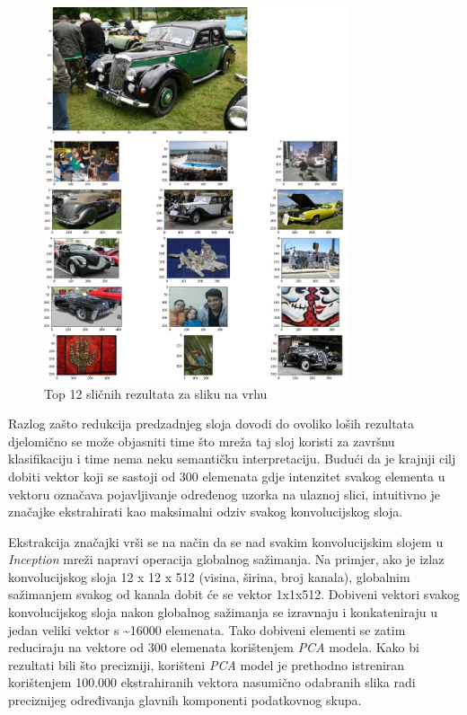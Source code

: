 \documentclass[times, utf8, proizvoljni, numeric]{fer}
\begin{document}
\begin{figure}[H]
	\begin{center}
		\captionsetup{justification=centering}
		\includegraphics[width=0.8\textwidth]{./imgs/inception_zadnji_sloj_auti_greska.png}
		\caption{Top 12 sličnih rezultata za sliku na vrhu}
		\label{fg:inception_zadnji_sloj_auti_greska}
	\end{center}
\end{figure}

Razlog zašto redukcija predzadnjeg sloja dovodi do ovoliko loših rezultata djelomično se može objasniti time što mreža taj sloj koristi za završnu klasifikaciju i time nema neku semantičku interpretaciju. Budući da je krajnji cilj dobiti vektor koji se sastoji od 300 elemenata gdje intenzitet svakog elementa u vektoru označava pojavljivanje određenog uzorka na ulaznoj slici, intuitivno je značajke ekstrahirati kao maksimalni odziv svakog konvolucijskog sloja.  

Ekstrakcija značajki vrši se na način da se nad svakim konvolucijskim slojem u \textit{Inception} mreži napravi operacija globalnog sažimanja. Na primjer, ako je izlaz konvolucijskog sloja 12 x 12 x 512 (visina, širina, broj kanala), globalnim sažimanjem svakog od kanala dobit će se vektor 1x1x512. Dobiveni vektori svakog konvolucijskog sloja nakon globalnog sažimanja se izravnaju i konkateniraju u jedan veliki vektor s  \textasciitilde16000 elemenata.  Tako dobiveni elementi se zatim reduciraju na vektore od 300 elemenata korištenjem \textit{PCA} modela. Kako bi rezultati bili što precizniji, korišteni \textit{PCA} model je prethodno istreniran korištenjem 100.000 ekstrahiranih vektora nasumično odabranih slika radi preciznijeg određivanja glavnih komponenti podatkovnog skupa.
\end{document}
